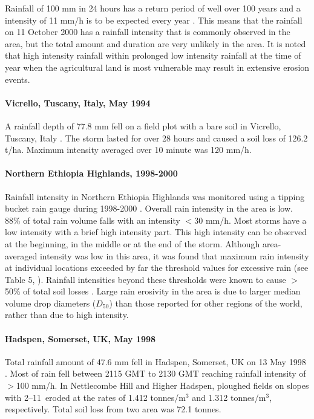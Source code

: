 Rainfall of 100 mm in 24 hours has a return period of well over 100 years and a
intensity of 11 mm/h is to be expected every year \citep{boardman2001-346}. This
means that the rainfall on 11 October 2000 has a rainfall intensity that is
commonly observed in the area, but the total amount and duration are very
unlikely in the area. It is noted that high intensity rainfall within prolonged
low intensity rainfall at the time of year when the agricultural land is most
vulnerable may result in extensive erosion events.


\paragraph{Vicrello, Tuscany, Italy, May 1994 \citep{torri1999-131}}
\label{sec:VicrelloVolterraTuscany}

A rainfall depth of 77.8 mm fell on a field plot with a bare soil in Vicrello,
Tuscany, Italy \citep{torri1999-131}. The storm lasted for over 28 hours and
caused a soil loss of 126.2 t/ha. Maximum intensity averaged over 10 minute was
120 mm/h.


\paragraph{Northern Ethiopia Highlands, 1998-2000 \citep{nyssen2005-172}}
\label{sec:NorthernEthiopiaHighlands}

Rainfall intensity in Northern Ethiopia Highlands was monitored using a tipping
bucket rain gauge during 1998-2000 \citep{nyssen2005-172}. Overall rain
intensity in the area is low. 88\% of total rain volume falls with an intensity
$<$30 mm/h. Most storms have a low intensity with a brief high intensity part.
This high intensity can be observed at the beginning, in the middle or at the
end of the storm.
Although area-averaged intensity was low in this area, it was found that maximum
rain intensity at individual locations exceeded by far the threshold values for
excessive rain (see Table 5, \citealp{nyssen2005-172}). Rainfall intensities
beyond these thresholds were known to cause $>$50\% of total soil losses
\citep{krauer1988-rainfallerosivityand}. Large rain erosivity in the area is due
to larger median volume drop diameters ($D_{50}$) than those reported for other
regions of the world, rather than due to high intensity.

\paragraph{Hadspen, Somerset, UK, May 1998 \citep{clark2000-17}}
\label{sec:HadspenSomersetUK}
Total rainfall amount of 47.6 mm fell in Hadspen, Somerset, UK on 13 May 1998
\citep{clark2000-17}. Most of rain fell between 2115 GMT to 2130 GMT reaching
rainfall intensity of $>$100 mm/h. In Nettlecombe Hill and Higher Hadspen,
ploughed fields on slopes with 2--11\textdegree\ eroded at the rates of 1.412
tonnes/m$^3$ and 1.312 tonnes/m$^3$, respectively. Total soil loss from two area
was 72.1 tonnes.

